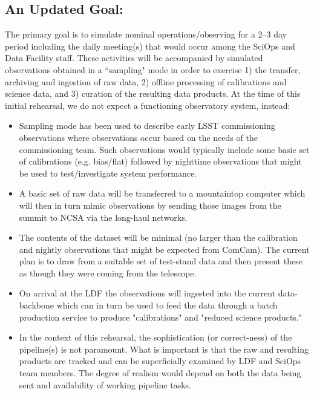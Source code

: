 \clearpage

\subsection{An Updated Goal:}

The primary goal is to simulate nominal operations/observing for a 2--3 day 
period including the daily meeting(s) that would occur among the SciOps and 
Data Facility staff.  These activities will be accompanied by simulated 
observations obtained in a ``sampling" mode in order to exercise 1) the 
transfer, archiving and ingestion of raw data, 2) offline processing of 
calibrations and science data, and 3) curation of the resulting data products.
At the time of this initial rehearsal, we do not expect a functioning 
observatory system, instead:

\begin{itemize}[topsep=0pt]
\item Sampling mode has been used to describe early LSST commissioning 
observations where observations occur based on the needs of the commissioning 
team.  Such observations would typically include some basic set of calibrations
(e.g. bias/flat) followed by nighttime observations that might be used to 
test/investigate system performance.

\item A basic set of raw data will be transferred to a mountaintop computer 
which will then in turn mimic observations by sending those images from the
summit to NCSA via the long-haul networks.

\item The contents of the dataset will be minimal (no larger than the 
calibration and nightly observations that might be expected from ComCam).  
The current plan is to draw from a suitable set of test-stand data and 
then present these as though they were coming from the telescope.

\item On arrival at the LDF the observations will ingested into the current 
data-backbone which can in turn be used to feed the data through a batch 
production service to produce "calibrations" and "reduced science products."

\item In the context of this rehearsal, the sophistication (or correct-ness) 
of the pipeline(s) is not paramount.  What is important is that the raw and 
resulting products are tracked and can be superficially examined by LDF and 
SciOps team members.  The degree of realism would depend on both the data
being sent and availability of working pipeline tasks.
\end{itemize}


